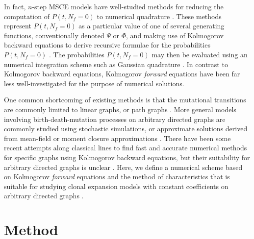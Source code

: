 \documentclass{article}
\begin{document}
In fact, $n$-step MSCE models have well-studied methods
for reducing the computation of $P(t,N_f = 0)$ to numerical quadrature
\cite{moolgavkar1992multistage,crump2005numerical,meza2008age,luebeck2013impact}.
These methods represent $P(t,N_f = 0)$ as a particular value of one of several generating functions, conventionally 
denoted $\Psi$ or $\Phi$, and making use of Kolmogorov backward equations to derive
recursive formulae for the probabilities $P(t,N_f = 0)$
\cite{crump2005numerical,moolgavkar1979two}. The probabilities $P(t,N_f = 0)$ may then
be evaluated using an numerical integration scheme such as Gaussian quadrature
\cite{luebeck2013impact}. In contrast to Kolmogorov backward equations, Kolmogorov \emph{forward} equations have been far less well-investigated for the purpose of numerical solutions.


One common shortcoming of existing methods is that the mutational transitions are 
commonly limited to linear graphs, or path graphs
\cite{luebeck2013impact,zhang2022waiting,zhang2022branching}. More general models involving
birth-death-mutation processes on arbitrary directed graphs are commonly
studied using stochastic simulations, or approximate solutions derived
from mean-field or moment closure approximations
\cite{patersonbozic2020colorectal,grima2010effective}. There have been some
recent attempts along classical lines to find fast and accurate numerical
methods for specific graphs
using Kolmogorov backward equations, but their suitability
for arbitrary directed graphs is unclear \cite{donotcite}.
Here, we define a numerical scheme based on Kolmogorov \emph{forward} equations
and the method of characteristics that is suitable for studying clonal expansion
models with constant coefficients on
arbitrary directed graphs \cite{crump2005numerical,quinn1989calculating}.

\section{Method}

\end{document}
